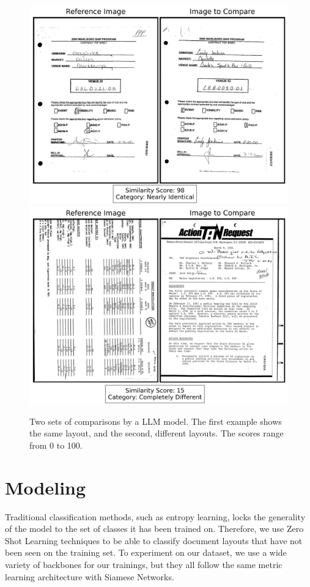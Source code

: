 \begin{figure}[htbp]
    \centering
    \includegraphics[width=.8\linewidth]{images/similar.png}
    \\[1em]
    \centering
    \includegraphics[width=.8\linewidth]{images/different.png}
    \caption{Two sets of comparisons by a LLM model. The first example shows the same layout, and the second, different layouts. The scores range from 0 to 100.}
    \label{fig:document_comparison}
\end{figure}

\section{Modeling}
\label{sec:method_modeling}

Traditional classification methods, such as entropy learning, locks the generality of the model to the set of classes it has been trained on. Therefore, we use Zero Shot Learning techniques to be able to classify document layouts that have not been seen on the training set. To experiment on our dataset, we use a wide variety of backbones for our trainings, but they all follow the same metric learning architecture with Siamese Networks.

